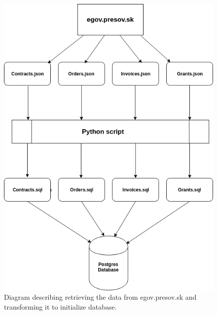 \documentclass[thesis=B,english]{FITthesis}[2012/06/26]
\begin{document}
{\begin{figure}[H]
  \begin{center}
  \includegraphics[scale=0.6]{pictures/jsonToDb.png}
  \caption{Diagram describing retrieving the data from egov.presov.sk and transforming it to initialize database.}
  \label{fig:jsonToDb}
  \end{center}
\end{figure}

}
\end{document}
